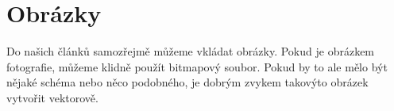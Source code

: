 \documentclass[a4paper, 11pt]{article}
\begin{document}
	\section{Obrázky}
    Do našich článků samozřejmě můžeme vkládat obrázky. Pokud je obrázkem fotografie, můžeme klidně použít bitmapový soubor. Pokud by to ale mělo být nějaké schéma nebo něco podobného, je dobrým zvykem takovýto obrázek vytvořit vektorově.
    \begin{figure}[h]
		\centering
\end{figure}
\end{document}
